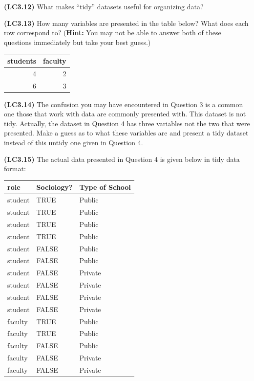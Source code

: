 \documentclass[]{tufte-book}
\begin{document}
\textbf{(LC3.12)} What makes ``tidy'' datasets useful for organizing
data?

\textbf{(LC3.13)} How many variables are presented in the table below?
What does each row correspond to? (\textbf{Hint:} You may not be able to
answer both of these questions immediately but take your best guess.)

\begin{tabular}{r|r}
\hline
students & faculty\\
\hline
4 & 2\\
\hline
6 & 3\\
\hline
\end{tabular}

\textbf{(LC3.14)} The confusion you may have encountered in Question 3
is a common one those that work with data are commonly presented with.
This dataset is not tidy. Actually, the dataset in Question 4 has three
variables not the two that were presented. Make a guess as to what these
variables are and present a tidy dataset instead of this untidy one
given in Question 4.

\textbf{(LC3.15)} The actual data presented in Question 4 is given below
in tidy data format:

\begin{tabular}{l|l|l}
\hline
role & Sociology? & Type of School\\
\hline
student & TRUE & Public\\
\hline
student & TRUE & Public\\
\hline
student & TRUE & Public\\
\hline
student & TRUE & Public\\
\hline
student & FALSE & Public\\
\hline
student & FALSE & Public\\
\hline
student & FALSE & Private\\
\hline
student & FALSE & Private\\
\hline
student & FALSE & Private\\
\hline
student & FALSE & Private\\
\hline
faculty & TRUE & Public\\
\hline
faculty & TRUE & Public\\
\hline
faculty & FALSE & Public\\
\hline
faculty & FALSE & Private\\
\hline
faculty & FALSE & Private\\
\hline
\end{tabular}
\end{document}
